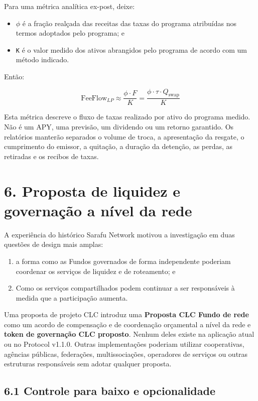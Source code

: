 \documentclass[11pt]{article}
\begin{document}
Para uma métrica analítica ex-post, deixe:

\begin{itemize}[leftmargin=*]
\item \texttt{$\phi$} é a fração realçada das receitas das taxas do programa atribuídas nos termos adoptados pelo programa; e
\item \texttt{K} é o valor medido dos ativos abrangidos pelo programa de acordo com um método indicado.
\end{itemize}
Então:

\[
\mathrm{FeeFlow}_{LP} \approx \frac{\phi \cdot F}{K} = \frac{\phi \cdot \tau \cdot Q_{\mathrm{swap}}}{K}
\]

Esta métrica descreve o fluxo de taxas realizado por ativo do programa medido. Não é um APY, uma previsão, um dividendo ou um retorno garantido. Os relatórios manterão separados o volume de troca, a apresentação da resgate, o cumprimento do emissor, a quitação, a duração da detenção, as perdas, as retiradas e os recibos de taxas.


\section*{6. Proposta de liquidez e governação a nível da rede}

A experiência do histórico Sarafu Network motivou a investigação em duas questões de design mais amplas:

\begin{enumerate}[leftmargin=*]
\item a forma como as Fundos governados de forma independente poderiam coordenar os serviços de liquidez e de roteamento; e
\item Como os serviços compartilhados podem continuar a ser responsáveis à medida que a participação aumenta.
\end{enumerate}
Uma proposta de projeto CLC introduz uma \textbf{Proposta CLC Fundo de rede} como um acordo de compensação e de coordenação orçamental a nível da rede e \textbf{token de governação CLC proposto}. Nenhum deles existe na aplicação atual ou no Protocol v1.1.0. Outras implementações poderiam utilizar cooperativas, agências públicas, federações, multissociações, operadores de serviços ou outras estruturas responsáveis sem adotar qualquer proposta.

\subsection*{6.1 Controle para baixo e opcionalidade}
\end{document}
